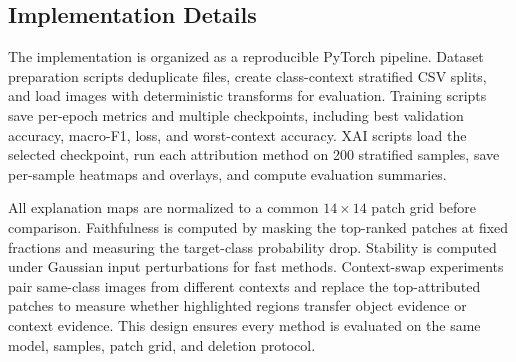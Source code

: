 \documentclass[10pt]{article}
\begin{document}
\subsection{Implementation Details}
The implementation is organized as a reproducible PyTorch pipeline. Dataset preparation scripts deduplicate files, create class-context stratified CSV splits, and load images with deterministic transforms for evaluation. Training scripts save per-epoch metrics and multiple checkpoints, including best validation accuracy, macro-F1, loss, and worst-context accuracy. XAI scripts load the selected checkpoint, run each attribution method on 200 stratified samples, save per-sample heatmaps and overlays, and compute evaluation summaries.

All explanation maps are normalized to a common $14\times14$ patch grid before comparison. Faithfulness is computed by masking the top-ranked patches at fixed fractions and measuring the target-class probability drop. Stability is computed under Gaussian input perturbations for fast methods. Context-swap experiments pair same-class images from different contexts and replace the top-attributed patches to measure whether highlighted regions transfer object evidence or context evidence. This design ensures every method is evaluated on the same model, samples, patch grid, and deletion protocol.
\end{document}
